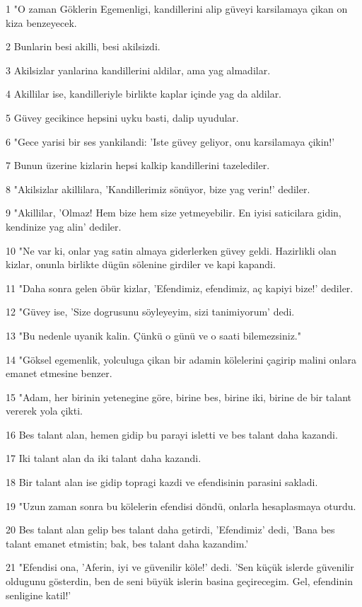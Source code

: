 \par 1 "O zaman Göklerin Egemenligi, kandillerini alip güveyi karsilamaya çikan on kiza benzeyecek.
\par 2 Bunlarin besi akilli, besi akilsizdi.
\par 3 Akilsizlar yanlarina kandillerini aldilar, ama yag almadilar.
\par 4 Akillilar ise, kandilleriyle birlikte kaplar içinde yag da aldilar.
\par 5 Güvey gecikince hepsini uyku basti, dalip uyudular.
\par 6 "Gece yarisi bir ses yankilandi: 'Iste güvey geliyor, onu karsilamaya çikin!'
\par 7 Bunun üzerine kizlarin hepsi kalkip kandillerini tazelediler.
\par 8 "Akilsizlar akillilara, 'Kandillerimiz sönüyor, bize yag verin!' dediler.
\par 9 "Akillilar, 'Olmaz! Hem bize hem size yetmeyebilir. En iyisi saticilara gidin, kendinize yag alin' dediler.
\par 10 "Ne var ki, onlar yag satin almaya giderlerken güvey geldi. Hazirlikli olan kizlar, onunla birlikte dügün sölenine girdiler ve kapi kapandi.
\par 11 "Daha sonra gelen öbür kizlar, 'Efendimiz, efendimiz, aç kapiyi bize!' dediler.
\par 12 "Güvey ise, 'Size dogrusunu söyleyeyim, sizi tanimiyorum' dedi.
\par 13 "Bu nedenle uyanik kalin. Çünkü o günü ve o saati bilemezsiniz."
\par 14 "Göksel egemenlik, yolculuga çikan bir adamin kölelerini çagirip malini onlara emanet etmesine benzer.
\par 15 "Adam, her birinin yetenegine göre, birine bes, birine iki, birine de bir talant vererek yola çikti.
\par 16 Bes talant alan, hemen gidip bu parayi isletti ve bes talant daha kazandi.
\par 17 Iki talant alan da iki talant daha kazandi.
\par 18 Bir talant alan ise gidip topragi kazdi ve efendisinin parasini sakladi.
\par 19 "Uzun zaman sonra bu kölelerin efendisi döndü, onlarla hesaplasmaya oturdu.
\par 20 Bes talant alan gelip bes talant daha getirdi, 'Efendimiz' dedi, 'Bana bes talant emanet etmistin; bak, bes talant daha kazandim.'
\par 21 "Efendisi ona, 'Aferin, iyi ve güvenilir köle!' dedi. 'Sen küçük islerde güvenilir oldugunu gösterdin, ben de seni büyük islerin basina geçirecegim. Gel, efendinin senligine katil!'
